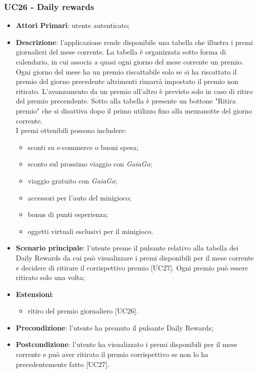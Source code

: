 \subsubsection{UC26 - Daily rewards}
\begin{itemize}
	\item \textbf{Attori Primari}: utente autenticato;
	\item \textbf{Descrizione}: l'applicazione rende disponibile una tabella che illustra i premi giornalieri del mese corrente. La tabella è organizzata sotto forma di calendario, in cui associa a quasi ogni giorno del mese corrente un premio. Ogni giorno del mese ha un premio riscattabile solo se si ha riscattato il premio del giorno precedente altrimenti rimarrà impostato il premio non ritirato. L'avanzamento da un premio all'altro è previsto solo in caso di ritiro del premio precendente. 
	Sotto alla tabella è presente un bottone "Ritira premio" che si disattiva dopo il primo utilizzo fino alla mezzanotte del giorno corrente.\\
	I premi ottenibili possono includere:
	\begin{itemize}
		\item sconti su e-commerce o buoni spesa;
		\item sconto sul prossimo viaggio con \textit{GaiaGo};
		\item viaggio gratuito con \textit{GaiaGo};
		\item accessori per l'auto del minigioco;
		\item bonus di punti esperienza;
		\item oggetti virtuali esclusivi per il minigioco.
	\end{itemize}
	\item \textbf{Scenario principale}: l'utente preme il pulsante relativo alla tabella dei Daily Rewards da cui può visualizzare i premi disponibili per il mese corrente e decidere di ritirare il corrispettivo premio [UC27].
	Ogni premio può essere ritirato solo una volta;
	\item \textbf{Estensioni}: 
		\begin{itemize}
			\item ritiro del premio giornaliero [UC26].
		\end{itemize}
	\item \textbf{Precondizione}: l'utente ha premuto il pulsante Daily Rewards;
	\item \textbf{Postcondizione}: l'utente ha visualizzato i premi disponibili per il mese corrente e può aver ritirato il premio corrispettivo se non lo ha precedentemente fatto [UC27]. 
\end{itemize} 
